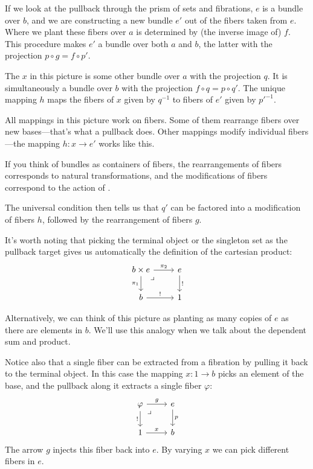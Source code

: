 \documentclass[DaoFP]{subfiles}
\begin{document}
If we look at the pullback through the prism of sets and fibrations, $e$ is a bundle over $b$, and we are constructing a new bundle $e'$ out of the fibers taken from $e$. Where we plant these fibers over $a$ is determined by (the inverse image of) $f$. This procedure makes $e'$ a bundle over both $a$ and $b$, the latter with the projection $p \circ g = f \circ p'$. 

The $x$ in this picture is some other bundle over $a$ with the projection $q$. It is simultaneously a bundle over $b$ with the projection $f \circ q = p \circ q'$. The unique mapping $h$ maps the fibers of $x$ given by $q^{-1}$ to fibers of $e'$ given by $p'^{-1}$. 

All mappings in this picture work on fibers. Some of them rearrange fibers over new bases---that's what a pullback does.  Other mappings modify individual fibers---the mapping $h \colon x \to e'$ works like this.

If you think of bundles as containers of fibers, the rearrangements of fibers corresponds to natural transformations, and the modifications of fibers correspond to the action of .
 
The universal condition then tells us that $q'$ can be factored into a modification of fibers $h$, followed by the rearrangement of fibers $g$.

It's worth noting that picking the terminal object or the singleton set as the pullback target gives us automatically the definition of the cartesian product:
\[
 \begin{tikzcd}
 b \times e
 \arrow[d, "\pi_1"']
 \arrow[r, "\pi_2"]
\arrow[dr, phantom,  , very near start, "\lrcorner"]
 & e
 \arrow[d, "!"]
 \\
 b
 \arrow[r, "!"]
 &
 1
  \end{tikzcd}
\]

Alternatively, we can think of this picture as planting as many copies of $e$ as there are elements in $b$. We'll use this analogy when we talk about the dependent sum and product.

Notice also that a single fiber can be extracted from a fibration by pulling it back to the terminal object. In this case the mapping $x \colon 1 \to b$ picks an element of the base, and the pullback along it extracts a single fiber $\varphi$:
\[
 \begin{tikzcd}
 \varphi
 \arrow[d, "!"']
 \arrow[r, "g"]
\arrow[dr, phantom,  , very near start, "\lrcorner"]
 & e
 \arrow[d, "p"]
 \\
 1
 \arrow[r, "x"]
 &
 b
  \end{tikzcd}
\]
The arrow $g$ injects this fiber back into $e$. By varying $x$ we can pick different fibers in $e$.
\end{document}
